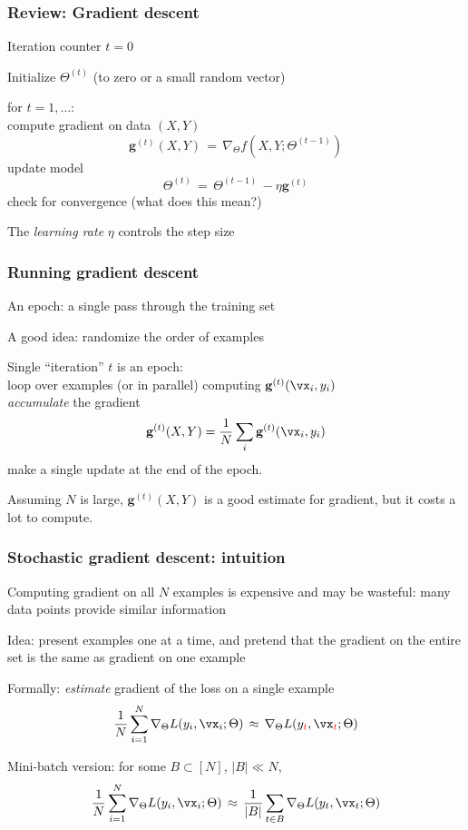 \documentclass[xcolor=dvipsnames]{beamer}
\begin{document}
\begin{frame}
  \frametitle{Review: Gradient descent}
  
\bi
\item Iteration counter $t=0$
\item Initialize $\Theta^{(t)}$ (to zero or a small random vector)
\item for $t=1,\ldots$:\\
  compute gradient on data $(X,Y)$
  \[
    \mathbf{g}^{(t)}(X,Y)\,=\,\nabla_\Theta f\left(X,Y;\Theta^{(t-1)}\right)
  \]
  update model
  \[\Theta^{(t)}\,=\,\Theta^{(t-1)}\,-\eta\mathbf{g}^{(t)}
\]
check for convergence (what does this mean?)
\item The \emph{learning rate} $\eta$ controls the step size 
\ei

\end{frame}


\begin{frame}
  \frametitle{Running gradient descent}
  \bi
\item An epoch: a single pass through the training set
\item A good idea: randomize the order of examples
\item Single ``iteration'' $t$ is an epoch:\\
loop over examples (or in parallel) computing
$\mathbf{g}^{(t)}(\vx_i,y_i)$\\
\emph{accumulate} the gradient 
\[\mathbf{g}^{(t)}(X,Y)=\frac{1}{N}\sum_i\mathbf{g}^{(t)}(\vx_i,y_i)
\]
make a single update at the end of the epoch.
\item Assuming $N$ is large, $\mathbf{g}^{(t)}(X,Y)$ is a good
  estimate for gradient, but it costs a lot to compute.
\ei
\end{frame}

\begin{frame}
  \frametitle{Stochastic gradient descent: intuition}
  \bi
\item Computing gradient on all $N$ examples is expensive and may be
  wasteful: many data points provide similar information
\item Idea: present examples one at a time, and pretend that the
  gradient on the entire set is the same as gradient on one example
\item Formally: \emph{estimate} gradient of the loss on a single example
\[\frac{1}{N}\sum_{i=1}^N\nabla_\Theta L(y_i,\vx_i;\Theta)\,\approx\,
\nabla_\Theta  L(y_{\textcolor{red}{t}},\vx_{\textcolor{red}{t}};\Theta)
\]
\item Mini-batch version: for some $B\subset [N]$, $|B|\ll N$,
\[\frac{1}{N}\sum_{i=1}^N\nabla_\Theta L(y_i,\vx_i;\Theta)\,\approx\,
\frac{1}{|B|}\sum_{t\in B }\nabla_\Theta L(y_t,\vx_t;\Theta)
\]
\ei

\end{frame}
\end{document}
